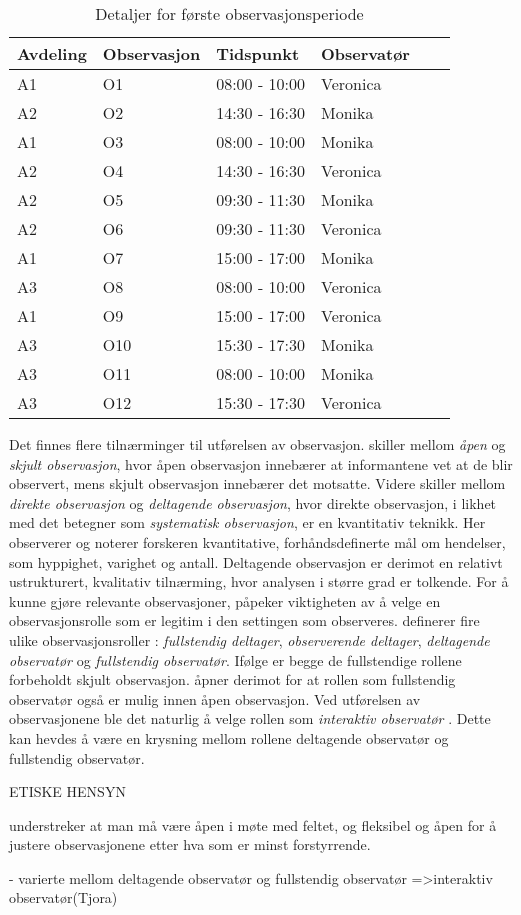 \begin{table}[H]\centering
    \begin{tabular}{ |l|l|l|l|l|l| }
    \hline
    Avdeling & Observasjon & Tidspunkt & Observatør \\ \hline
 	A1 & O1 & 08:00 - 10:00 & Veronica \\ \hline
 	A2 & O2 & 14:30 - 16:30 & Monika \\ \hline
	A1 & O3 & 08:00 - 10:00 & Monika \\ \hline
 	A2 & O4 & 14:30 - 16:30 & Veronica \\ \hline
   	A2 & O5 & 09:30 - 11:30 & Monika \\ \hline
 	A2 & O6 & 09:30 - 11:30 & Veronica \\ \hline
	A1 & O7 & 15:00 - 17:00 & Monika \\ \hline
 	A3 & O8 & 08:00 - 10:00 & Veronica \\ \hline
 	A1 & O9 & 15:00 - 17:00 & Veronica \\ \hline
 	A3 & O10 & 15:30 - 17:30 & Monika \\ \hline
	A3 & O11 & 08:00 - 10:00 & Monika \\ \hline
 	A3 & O12 & 15:30 - 17:30 & Veronica \\ \hline
    \end{tabular}
    \caption {Detaljer for første observasjonsperiode}
    \label{detaljer}
\end{table}

\noindent
Det finnes flere tilnærminger til utførelsen av observasjon. \citet{Oates} skiller mellom \textit{åpen} og \textit{skjult observasjon}, hvor åpen observasjon innebærer at informantene vet at de blir observert, mens skjult observasjon innebærer det motsatte. Videre skiller \citet{Greg} mellom \textit{direkte observasjon} og \textit{deltagende observasjon}, hvor direkte observasjon, i likhet med det \citet{Oates} betegner som \textit{systematisk observasjon}, er en kvantitativ teknikk. Her observerer og noterer forskeren kvantitative, forhåndsdefinerte mål om hendelser, som hyppighet, varighet og antall. Deltagende observasjon er derimot en relativt ustrukturert, kvalitativ tilnærming, hvor analysen i større grad er tolkende. For å kunne gjøre relevante observasjoner, påpeker \citet{Tjora} viktigheten av å velge en observasjonsrolle som er legitim i den settingen som  observeres. \citet{Gold58} definerer fire ulike observasjonsroller : \textit{fullstendig deltager}, \textit{observerende deltager}, \textit{deltagende observatør} og \textit{fullstendig observatør}. Ifølge \cite{Gold58} er begge de fullstendige rollene forbeholdt skjult observasjon. \citet{Oates} åpner derimot for at rollen som fullstendig observatør også er mulig innen åpen observasjon. Ved utførelsen av observasjonene ble det naturlig å velge rollen som \textit{interaktiv observatør} \citep{Tjora}. Dette kan hevdes å være en krysning mellom rollene deltagende observatør og fullstendig observatør. 


 
ETISKE HENSYN

\citet{Tjora} understreker at man må være åpen i møte med feltet, og fleksibel og åpen for å justere observasjonene etter hva som er minst forstyrrende. 



- varierte mellom deltagende observatør og fullstendig observatør =>interaktiv observatør(Tjora)

